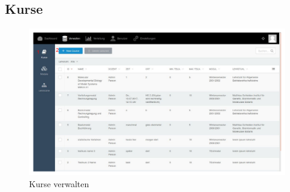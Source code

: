     \subsection{Kurse}
    
    \begin{figure}
    	\centering
    	\includegraphics[scale=0.5]{backend/img/verwalten_kurse.pdf}
    	\caption{Kurse verwalten}
    	\label{fig:manage_course}
    \end{figure}
    
